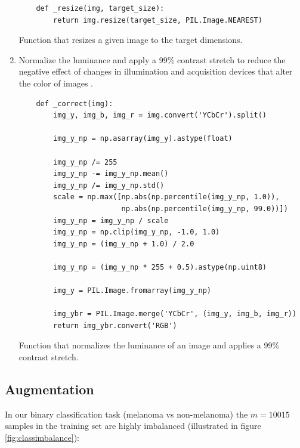 \begin{enumerate}
    \begin{listing}[ht]
    \begin{verbatim}
    def _resize(img, target_size):
        return img.resize(target_size, PIL.Image.NEAREST)
    \end{verbatim}
    \caption{Function that resizes a given image to the target dimensions.}
    \label{code:resize}
    \end{listing}

    \item Normalize the luminance and apply a 99\% contrast stretch to reduce the negative effect of changes in illumination and acquisition devices that alter the color of images \cite{colorconstancy}.

    \begin{listing}[ht]
    \begin{verbatim}
    def _correct(img):
        img_y, img_b, img_r = img.convert('YCbCr').split()

        img_y_np = np.asarray(img_y).astype(float)

        img_y_np /= 255
        img_y_np -= img_y_np.mean()
        img_y_np /= img_y_np.std()
        scale = np.max([np.abs(np.percentile(img_y_np, 1.0)),
                        np.abs(np.percentile(img_y_np, 99.0))])
        img_y_np = img_y_np / scale
        img_y_np = np.clip(img_y_np, -1.0, 1.0)
        img_y_np = (img_y_np + 1.0) / 2.0

        img_y_np = (img_y_np * 255 + 0.5).astype(np.uint8)

        img_y = PIL.Image.fromarray(img_y_np)

        img_ybr = PIL.Image.merge('YCbCr', (img_y, img_b, img_r))
        return img_ybr.convert('RGB')
    \end{verbatim}
    \caption{Function that normalizes the luminance of an image and applies a 99\% contrast stretch.}
    \label{code:correct}
    \end{listing}
\end{enumerate}

\subsection{Augmentation}
\label{subsection:augmentation}

In our binary classification task (melanoma vs non-melanoma) the $m = 10015$ samples in the training set are highly imbalanced (illustrated in figure \ref{fig:classimbalance}):

